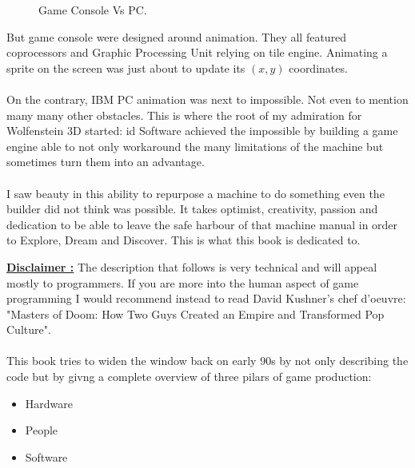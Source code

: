 \begin{figure}[H]
\centering
   \caption{Game Console Vs PC.} \label{fig:game_console_vs_PC}
 \end{figure}
 
But game console were designed around animation. They all featured coprocessors and Graphic Processing Unit relying on tile engine. Animating a sprite on the screen was just about to update its $(x,y)$ coordinates.\\
\\
On the contrary, IBM PC animation was next to impossible. Not even to mention many many other obstacles. This is where the root of my admiration for Wolfenstein 3D started: id Software achieved the impossible by building a game engine able to not only workaround the many limitations of the machine but sometimes turn them into an advantage.\\
\\
I saw beauty in this ability to repurpose a machine to do something even the builder did not think was possible. It takes optimist, creativity, passion and dedication to be able to leave the safe harbour of that machine manual in order to Explore, Dream and Discover. This is what this book is dedicated to.\\
\bigskip

 \textbf{\underline{Disclaimer :}} The description that follows is very technical and will appeal mostly to programmers. If you are more into the human aspect of game programming I would recommend instead to read David Kushner's chef d'oeuvre: "Masters of Doom: How Two Guys Created an Empire and Transformed Pop Culture".\\
 \\
This book tries to widen the window back on early 90s by not only describing the code but by givng a complete overview of three pilars of game production:\\
\begin{itemize}
\item Hardware
\item People
\item Software
\end{itemize}
